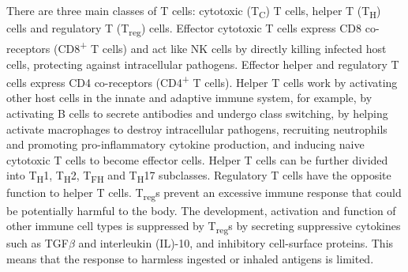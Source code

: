 There are three main classes of T cells: cytotoxic (T\textsubscript{C}) T cells, helper T (T\textsubscript{H}) cells and regulatory T (T\textsubscript{reg}) cells.
Effector cytotoxic T cells express CD8 co-receptors (CD8\textsuperscript{+} T cells) and act like NK cells by directly killing infected host cells, protecting against intracellular pathogens.
Effector helper and regulatory T cells express CD4 co-receptors (CD4\textsuperscript{+} T cells)\cite{luckheeram2012cd4}.
Helper T cells work by activating other host cells in the innate and adaptive immune system, for example, by activating B cells to secrete antibodies and undergo class switching, by helping activate macrophages to destroy intracellular pathogens, recruiting neutrophils and promoting pro-inflammatory cytokine production, and inducing naive cytotoxic T cells to become effector cells.
Helper T cells can be further divided into T\textsubscript{H}1, T\textsubscript{H}2, T\textsubscript{FH} and T\textsubscript{H}17 subclasses\cite{alberts2007molecularimmune,luckheeram2012cd4}.
Regulatory T cells have the opposite function to helper T cells.
T\textsubscript{reg}s prevent an excessive immune response that could be potentially harmful to the body.
The development, activation and function of other immune cell types is suppressed by T\textsubscript{reg}s by secreting suppressive cytokines such as TGF$\beta$ and interleukin (IL)-10, and inhibitory cell-surface proteins.
This means that the response to harmless ingested or inhaled antigens is limited\cite{alberts2007molecularimmune}.

%
